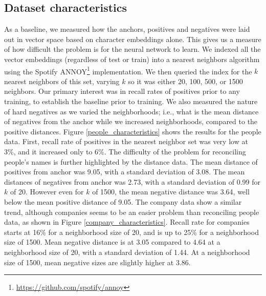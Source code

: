 \subsection{Dataset characteristics}
As a baseline, we measured how the anchors, positives and negatives were laid out in vector space based on character embeddings alone.  This gives us a measure of how difficult the problem is for the neural network to learn.  We indexed all the vector embeddings (regardless of test or train) into a nearest neighbors algorithm using the Spotify ANNOY\footnote{\url{https://github.com/spotify/annoy}} implementation.  We then queried the index for the $k$ nearest neighbors of this set, varying $k$ so it was either 20, 100, 500, or 1500 neighbors.  Our primary interest was in recall rates of positives prior to any training, to establish the baseline prior to training.  We also measured the nature of hard negatives as we varied the neighborhoods; i.e., what is the mean distance of negatives from the anchor while we increased neighborhoods, compared to the positive distances.  Figure \ref{people_characteristics} shows the results for the people data.  First, recall rate of positives in the nearest neighbor set was very low at 3\%, and it increased only to 6\%.  The difficulty of the problem for reconciling people's names is further highlighted by the distance data.  The mean distance of positives from anchor was 9.05, with a standard deviation of 3.08.  The mean distances of negatives from anchor was 2.73, with a standard deviation of 0.99 for $k$ of 20.  However even for $k$ of 1500, the mean negative distance was 3.64, well below the mean positive distance of 9.05.  The company data show a similar trend, although companies seems to be an easier problem than reconciling people data, as shown in Figure \ref{company_characteristics}.  Recall rate for companies starts at 16\% for a neighborhood size of 20, and is up to 25\% for a neighborhood size of 1500.  Mean negative distance is at 3.05 compared to 4.64 at a neighborhood size of 20, with a standard deviation of 1.44.  At a neighborhood size of 1500, mean negative sizes are slightly higher at 3.86. 

